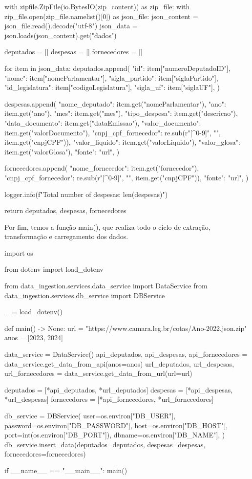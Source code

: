 \documentclass[12pt, a4paper]{article}
\begin{document}
\begin{python}
		with zipfile.ZipFile(io.BytesIO(zip_content)) as zip_file:
			with zip_file.open(zip_file.namelist()[0]) as json_file:
				json_content = json_file.read().decode("utf-8")
				json_data = json.loads(json_content).get("dados")
		
		deputados = []
		despesas = []
		fornecedores = []
		
		for item in json_data:
			deputados.append({
				"id": item["numeroDeputadoID"],
				"nome": item["nomeParlamentar"],
				"sigla_partido": item["siglaPartido"],
				"id_legislatura": item["codigoLegislatura"],
				"sigla_uf": item["siglaUF"],
			})
			
			despesas.append({
				"nome_deputado": item.get("nomeParlamentar"),
				"ano": item.get("ano"),
				"mes": item.get("mes"),
				"tipo_despesa": item.get("descricao"),
				"data_documento": item.get("dataEmissao"),
				"valor_documento": item.get("valorDocumento"),
				"cnpj_cpf_fornecedor": re.sub(r"[^0-9]", "", item.get("cnpjCPF")),
				"valor_liquido": item.get("valorLiquido"),
				"valor_glosa": item.get("valorGlosa"),
				"fonte": "url",
			})
			
			fornecedores.append({
				"nome_fornecedor": item.get("fornecedor"),
				"cnpj_cpf_fornecedor": re.sub(r"[^0-9]", "", item.get("cnpjCPF")),
				"fonte": "url",
			})
		
		logger.info(f"Total number of despesas: {len(despesas)}")
		
		return deputados, despesas, fornecedores
\end{python}


Por fim, temos a função main(), que realiza todo o ciclo de extração, transformação e carregamento dos dados.

\begin{python}
import os

from dotenv import load_dotenv

from data_ingestion.services.data_service import DataService
from data_ingestion.services.db_service import DBService

_ = load_dotenv()


def main() -> None:
	url = "https://www.camara.leg.br/cotas/Ano-2022.json.zip"
	anos = [2023, 2024]
	
	data_service = DataService()
	api_deputados, api_despesas, api_fornecedores = data_service.get_data_from_api(anos=anos)
	url_deputados, url_despesas, url_fornecedores = data_service.get_data_from_url(url=url)
	
	deputados = [*api_deputados, *url_deputados]
	despesas = [*api_despesas, *url_despesas]
	fornecedores = [*api_fornecedores, *url_fornecedores]
	
	db_service = DBService(
		user=os.environ["DB_USER"],
		password=os.environ["DB_PASSWORD"],
		host=os.environ["DB_HOST"],
		port=int(os.environ["DB_PORT"]),
		dbname=os.environ["DB_NAME"],
	)
	db_service.insert_data(deputados=deputados, despesas=despesas, fornecedores=fornecedores)


if __name__ == "__main__":
	main()
\end{python}
\end{document}
